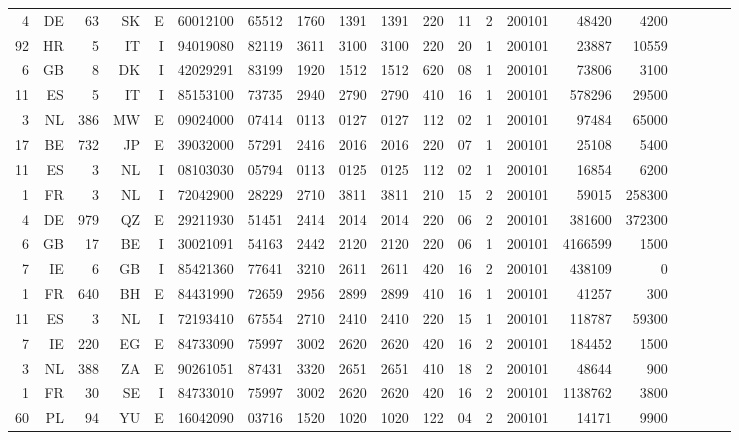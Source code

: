 {\begin{tabular}{rrrrrrrrrrrrrrrrrrrr}
 4 & DE & 63 & SK & E & 60012100 & 65512 & 1760 & 1391 & 1391 & 220 & 11 & 2 & 200101 & 48420 & 4200 \\
 92 & HR & 5 & IT & I & 94019080 & 82119 & 3611 & 3100 & 3100 & 220 & 20 & 1 & 200101 & 23887 & 10559 \\
 6 & GB & 8 & DK & I & 42029291 & 83199 & 1920 & 1512 & 1512 & 620 & 08 & 1 & 200101 & 73806 & 3100 \\
 11 & ES & 5 & IT & I & 85153100 & 73735 & 2940 & 2790 & 2790 & 410 & 16 & 1 & 200101 & 578296 & 29500 \\
 3 & NL & 386 & MW & E & 09024000 & 07414 & 0113 & 0127 & 0127 & 112 & 02 & 1 & 200101 & 97484 & 65000 \\
 17 & BE & 732 & JP & E & 39032000 & 57291 & 2416 & 2016 & 2016 & 220 & 07 & 1 & 200101 & 25108 & 5400 \\
 11 & ES & 3 & NL & I & 08103030 & 05794 & 0113 & 0125 & 0125 & 112 & 02 & 1 & 200101 & 16854 & 6200 \\
 1 & FR & 3 & NL & I & 72042900 & 28229 & 2710 & 3811 & 3811 & 210 & 15 & 2 & 200101 & 59015 & 258300 \\
 4 & DE & 979 & QZ & E & 29211930 & 51451 & 2414 & 2014 & 2014 & 220 & 06 & 2 & 200101 & 381600 & 372300 \\
 6 & GB & 17 & BE & I & 30021091 & 54163 & 2442 & 2120 & 2120 & 220 & 06 & 1 & 200101 & 4166599 & 1500 \\
 7 & IE & 6 & GB & I & 85421360 & 77641 & 3210 & 2611 & 2611 & 420 & 16 & 2 & 200101 & 438109 & 0 \\
 1 & FR & 640 & BH & E & 84431990 & 72659 & 2956 & 2899 & 2899 & 410 & 16 & 1 & 200101 & 41257 & 300 \\
 11 & ES & 3 & NL & I & 72193410 & 67554 & 2710 & 2410 & 2410 & 220 & 15 & 1 & 200101 & 118787 & 59300 \\
 7 & IE & 220 & EG & E & 84733090 & 75997 & 3002 & 2620 & 2620 & 420 & 16 & 2 & 200101 & 184452 & 1500 \\
 3 & NL & 388 & ZA & E & 90261051 & 87431 & 3320 & 2651 & 2651 & 410 & 18 & 2 & 200101 & 48644 & 900 \\
 1 & FR & 30 & SE & I & 84733010 & 75997 & 3002 & 2620 & 2620 & 420 & 16 & 2 & 200101 & 1138762 & 3800 \\
 60 & PL & 94 & YU & E & 16042090 & 03716 & 1520 & 1020 & 1020 & 122 & 04 & 2 & 200101 & 14171 & 9900 \\
 \bottomrule
\end{tabular}
}
